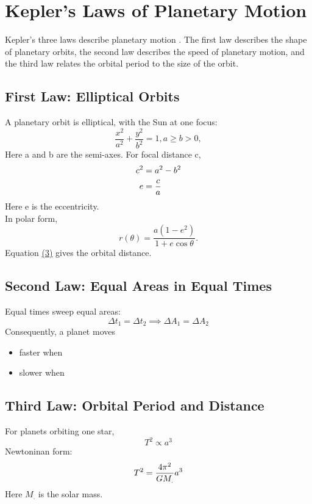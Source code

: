 \documentclass[11pt]{article}
\begin{document}
\section{Kepler’s Laws of Planetary Motion}
Kepler’s three laws describe planetary motion \cite{nasa_kepler}. The first law describes the shape of planetary orbits, the second law describes the speed of planetary motion, and the third law relates the orbital period to the size of the orbit.
\subsection{First Law: Elliptical Orbits}
A planetary orbit is elliptical, with the Sun at one focus:
\begin{equation}
    \frac{x^{2}}{a^{2}} + \frac{y^{2}}{b^{2}} =1 , a \ge b > 0,
\end{equation}
Here a and b are the semi-axes.
For focal distance c,
\begin{align}
    c^{2} &= a^{2} - b^{2} \notag \\
    e &= \frac{c}{a}
\end{align}
Here e is the eccentricity.\\
In polar form,
\begin{equation}
    r(\theta) = \frac{a(1-e^{2}) }{1+e\cos\theta}.
    \label{eq:big}
\end{equation}
Equation \hyperref[eq:big]{(3)} gives the orbital distance.

\subsection{Second Law: Equal Areas in Equal Times}
Equal times sweep equal areas:
\begin{equation}
    \Delta t_{1} =\Delta t_{2} \implies \Delta A_{1} =\Delta A_{2}
\end{equation}
Consequently, a planet moves
\begin{itemize}[label=$\diamond$]
    \item faster when
    \item slower when
\end{itemize}

\subsection{Third Law: Orbital Period and Distance}
For planets orbiting one star,
\begin{equation}
    T^{2} \propto a^{3}
\end{equation}
Newtoninan form:
\begin{equation}
    T^{2} = \frac{4 \pi^{2}}{GM_{.}}a^{3} \notag
\end{equation}
Here $M_{.}$ is the solar mass.
\end{document}
